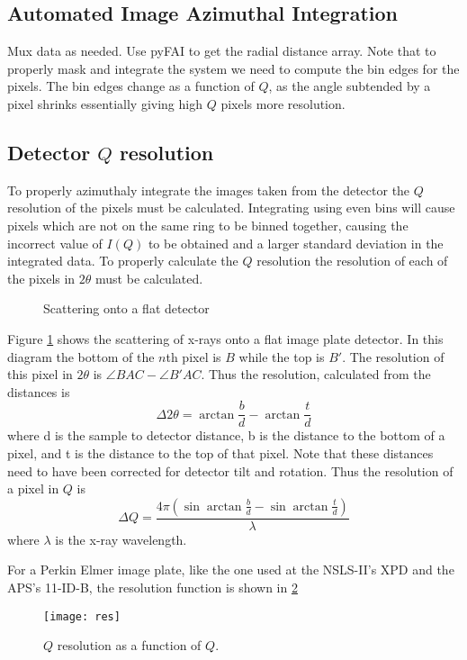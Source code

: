 \subsection{Automated Image Azimuthal Integration}
Mux data as needed. 
Use pyFAI to get the radial distance array.
Note that to properly mask and integrate the system we need to compute the bin edges for the pixels.
The bin edges change as a function of $Q$, as the angle subtended by a pixel shrinks essentially giving high $Q$ pixels more resolution.

\subsection{Detector $Q$ resolution} \label{subsec:qres}
To properly azimuthaly integrate the images taken from the detector the $Q$ resolution of the pixels must be calculated.
Integrating using even bins will cause pixels which are not on the same ring to be binned together, causing the incorrect value of $I(Q)$ to be obtained and a larger standard deviation in the integrated data.
To properly calculate the $Q$ resolution the resolution of each of the pixels in $2\theta$ must be calculated.
\begin{figure}
    \centering
    \caption{Scattering onto a flat detector}
    \label{fig:scattering_digram}
\end{figure}
Figure \ref{fig:scattering_digram} shows the scattering of x-rays onto a flat image plate detector.
In this diagram the bottom of the $n$th pixel is $B$ while the top is $B'$.
The resolution of this pixel in $2\theta$ is $\angle BAC - \angle B'AC$.
Thus the resolution, calculated from the distances is
\begin{equation}
\Delta 2 \theta = \arctan{\frac{b}{d}} - \arctan{\frac{t}{d}}
\end{equation}
where d is the sample to detector distance, b is the distance to the bottom of a pixel, and t is the distance to the top of that pixel.
Note that these distances need to have been corrected for detector tilt and rotation.
Thus the resolution of a pixel in $Q$ is
\begin{equation}
\Delta Q = \frac{4\pi(\sin{\arctan{\frac{b}{d}}} - \sin{\arctan{\frac{t}{d}}})}{\lambda}
\end{equation}
where $\lambda$ is the x-ray wavelength.

For a Perkin Elmer image plate, like the one used at the NSLS-II's XPD and the APS's 11-ID-B, the resolution function is shown in \ref{fig:res_func}
\begin{figure}[!ht]
  \texttt{[image: res]}
\caption{$Q$ resolution as a function of $Q$.}
\label{fig:res_func}
\end{figure}


